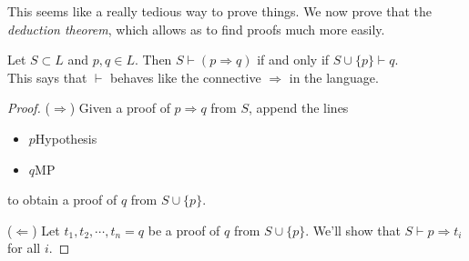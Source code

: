 \documentclass[a4paper]{article}
\begin{document}
This seems like a really tedious way to prove things. We now prove that the \emph{deduction theorem}, which allows as to find proofs much more easily.

\begin{prop}
  Let $S\subset L$ and $p, q\in L$. Then $S\vdash (p\Rightarrow q)$ if and only if $S\cup \{p\} \vdash q$.\\

  This says that $\vdash$ behaves like the connective $\Rightarrow $ in the language.
\end{prop}

\begin{proof}
  ($\Rightarrow $) Given a proof of $p\Rightarrow q$ from $S$, append the lines
  \begin{itemize}
    \item $p$\hfill Hypothesis
    \item $q$\hfill MP
  \end{itemize}
  to obtain a proof of $q$ from $S\cup \{p\}$.

  ($\Leftarrow$) Let $t_1, t_2, \cdots, t_n = q$ be a proof of $q$ from $S\cup \{p\}$. We'll show that $S\vdash p\Rightarrow t_i$ for all $i$.


\end{proof}
\end{document}
